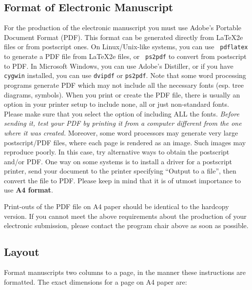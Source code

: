 \documentclass[11pt]{article}
\begin{document}
\subsection{Format of Electronic Manuscript}
\label{sect:pdf}

For the production of the electronic manuscript you must use Adobe's
Portable Document Format (PDF). 
This format can be generated directly from \LaTeX2e files or from
postscript ones. On Linux/Unix-like systems, you can use {\tt
  pdflatex} to generate a PDF file from \LaTeX2e files, or {\tt
  ps2pdf} to convert from postscript to PDF. 
In Microsoft Windows, you can use Adobe's Distiller, or if you have
\texttt{cygwin} installed, you can use \texttt{dvipdf} or
\texttt{ps2pdf}. Note that some word processing programs generate PDF
which may not include all the necessary fonts (esp. tree diagrams,
symbols). When you print or create the PDF file, there is usually an
option in your printer setup to include none, all or just non-standard
fonts.  Please make sure that you select the option of including ALL
the fonts. {\em Before sending it, test your PDF by printing it from a
  computer different from the one where it was created.} Moreover,
some word processors may generate very large postscript/PDF files,
where each page is rendered as an image. Such images may reproduce
poorly. In this case, try alternative ways to obtain the postscript
and/or PDF. One way on some systems is to install a driver for a
postscript printer, send your document to the printer specifying
``Output to a file'', then convert the file to PDF.
Please keep in mind that it is of utmost importance to use \textbf{A4 format}.


Print-outs of the PDF file on A4 paper should be identical to the
hardcopy version. If you cannot meet the above requirements about the
production of your electronic submission, please contact the
program chair above as soon as possible.


\subsection{Layout}
\label{ssec:layout}

Format manuscripts two columns to a page, in the manner these
instructions are formatted. The exact dimensions for a page on A4
paper are:
\end{document}
